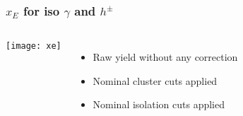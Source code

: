 \begin{frame}
\frametitle{$x_E$ for iso $\gamma$ and $h^{\pm}$ }
\begin{columns}[c]
\centering
\texttt{[image: xe]}\\
\begin{itemize}
\item Raw yield without any correction
\item Nominal cluster cuts applied
\item Nominal isolation cuts applied
\end{itemize}
\end{columns}
\end{frame}




